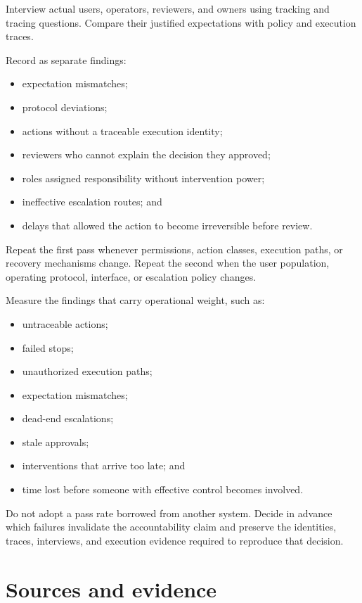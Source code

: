 Interview actual users, operators, reviewers, and owners using tracking and tracing questions. Compare their justified expectations with policy and execution traces.

Record as separate findings:

\begin{itemize}
\tightlist
\item
  expectation mismatches;
\item
  protocol deviations;
\item
  actions without a traceable execution identity;
\item
  reviewers who cannot explain the decision they approved;
\item
  roles assigned responsibility without intervention power;
\item
  ineffective escalation routes; and
\item
  delays that allowed the action to become irreversible before review.
\end{itemize}

Repeat the first pass whenever permissions, action classes, execution paths, or recovery mechanisms change. Repeat the second when the user population, operating protocol, interface, or escalation policy changes.

Measure the findings that carry operational weight, such as:

\begin{itemize}
\tightlist
\item
  untraceable actions;
\item
  failed stops;
\item
  unauthorized execution paths;
\item
  expectation mismatches;
\item
  dead-end escalations;
\item
  stale approvals;
\item
  interventions that arrive too late; and
\item
  time lost before someone with effective control becomes involved.
\end{itemize}

Do not adopt a pass rate borrowed from another system. Decide in advance which failures invalidate the accountability claim and preserve the identities, traces, interviews, and execution evidence required to reproduce that decision.

\section*{Sources and evidence}

